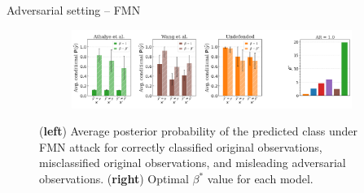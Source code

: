 
\begin{frame}{Adversarial setting -- FMN}
	\begin{figure}[H]
		\centering
		\begin{subfigure}[b]{\textwidth}
			\centering
			\includegraphics[width=\textwidth]{img/adversarial/bpda_wang_undefended_beta_fmn.png}
		\end{subfigure}
	   
		\caption{(\textbf{left}) Average posterior probability of the predicted class under
		FMN attack for correctly classified original observations, misclassified original observations, and 
		misleading adversarial observations.
		(\textbf{right}) Optimal $\beta^{*}$ value for each model.
		}
		\label{fig:unrobust_posterior_short_fmn}
	\end{figure}
\end{frame}

